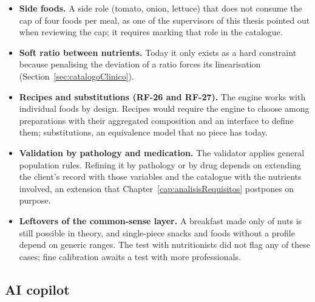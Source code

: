 \begin{itemize}
    \item \textbf{Side foods.} A side role (tomato, onion, lettuce) that does not consume the cap of four foods per meal, as one of the supervisors of this thesis pointed out when reviewing the cap; it requires marking that role in the catalogue.
    \item \textbf{Soft ratio between nutrients.} Today it only exists as a hard constraint because penalising the deviation of a ratio forces its linearisation (Section~\ref{sec:catalogoClinico}).
    \item \textbf{Recipes and substitutions (RF-26 and RF-27).} The engine works with individual foods by design. Recipes would require the engine to choose among preparations with their aggregated composition and an interface to define them; substitutions, an equivalence model that no piece has today.
    \item \textbf{Validation by pathology and medication.} The validator applies general population rules. Refining it by pathology or by drug depends on extending the client's record with those variables and the catalogue with the nutrients involved, an extension that Chapter~\ref{cap:analisisRequisitos} postpones on purpose.
    \item \textbf{Leftovers of the common-sense layer.} A breakfast made only of nuts is still possible in theory, and single-piece snacks and foods without a profile depend on generic ranges. The test with nutritionists did not flag any of these cases; fine calibration awaits a test with more professionals.
\end{itemize}

\subsection*{AI copilot}
\label{sec:futureCopilot}

